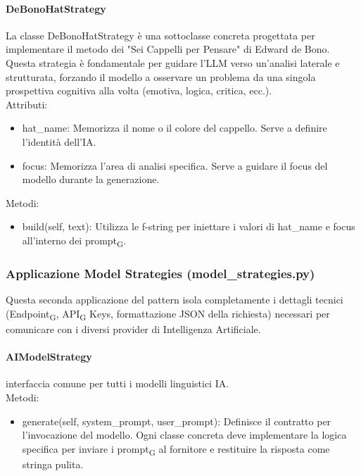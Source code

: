 \documentclass[11pt,a4paper]{article}
\newcommand{\gls}[1]{#1\textsubscript{G}}
\begin{document}
\paragraph{DeBonoHatStrategy}
La classe DeBonoHatStrategy è una sottoclasse concreta progettata per implementare il metodo dei "Sei Cappelli per Pensare" di Edward de Bono. Questa strategia è fondamentale per guidare l'LLM verso un'analisi laterale e strutturata, forzando il modello a osservare un problema da una singola prospettiva cognitiva alla volta (emotiva, logica, critica, ecc.).
\\Attributi:
\begin{itemize}
    \item hat\_name: Memorizza il nome o il colore del cappello. Serve a definire l'identità dell'IA.
    \item focus: Memorizza l'area di analisi specifica. Serve a guidare il focus del modello durante la generazione.
\end{itemize}
Metodi: \\
\begin{itemize}
    \item build(self, text): Utilizza le f-string per iniettare i valori di hat\_name e focus all'interno dei \gls{prompt}.
\end{itemize}

\subsubsection{Applicazione Model Strategies
(model\_strategies.py)}
Questa seconda applicazione del pattern isola completamente i dettagli tecnici (\gls{Endpoint}, \gls{API} Keys, formattazione JSON della richiesta) necessari per comunicare con i diversi provider di Intelligenza Artificiale.
\paragraph{AIModelStrategy} interfaccia comune per tutti i modelli linguistici IA.
\\Metodi:
\begin{itemize}
    \item generate(self, system\_prompt, user\_prompt): Definisce il contratto per l'invocazione del modello. Ogni classe concreta deve implementare la logica specifica per inviare i \gls{prompt} al fornitore e restituire la risposta come stringa pulita.
\end{itemize}
\end{document}
